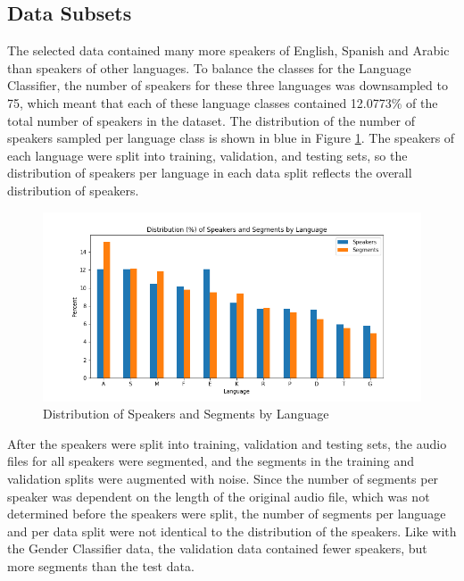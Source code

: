 \subsection{Data Subsets}
The selected data contained many more speakers of English, Spanish and Arabic than speakers of other languages. To balance the classes for the Language Classifier, the number of speakers for these three languages was downsampled to 75, which meant that each of these language classes contained 12.0773\% of the total number of speakers in the dataset. %
The distribution of the number of speakers sampled per language class is shown in blue in Figure \ref{fig:LangDistTot}. The speakers of each language were split into training, validation, and testing sets, so the distribution of speakers per language in each data split reflects the overall distribution of speakers.

\begin{figure}[h]
\begin{center}
\includegraphics[width=5in]{LangDistPercentSpSeg.png}
\caption{Distribution of Speakers and Segments by Language}
\label{fig:LangDistTot}
\end{center}
\end{figure}

After the speakers were split into training, validation and testing sets, the audio files for all speakers were segmented, and the segments in the training and validation splits were augmented with noise. Since the number of segments per speaker was dependent on the length of the original audio file, which was not determined before the speakers were split, the number of segments per language and per data split were not identical to the distribution of the speakers. Like with the Gender Classifier data, the validation data contained fewer speakers, but more segments than the test data.

